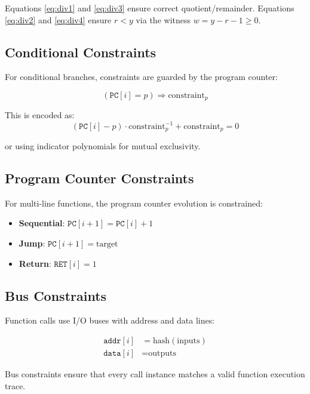 \documentclass[11pt,a4paper]{article}
\begin{document}
Equations \eqref{eq:div1} and \eqref{eq:div3} ensure correct quotient/remainder.
Equations \eqref{eq:div2} and \eqref{eq:div4} ensure $r < y$ via the witness $w = y - r - 1 \geq 0$.

\subsection{Conditional Constraints}

For conditional branches, constraints are guarded by the program counter:

\begin{equation}
(\texttt{PC}[i] = p) \Rightarrow \text{constraint}_p
\end{equation}

This is encoded as:
\begin{equation}
(\texttt{PC}[i] - p) \cdot \text{constraint}_p^{-1} + \text{constraint}_p = 0
\end{equation}

or using indicator polynomials for mutual exclusivity.

\subsection{Program Counter Constraints}

For multi-line functions, the program counter evolution is constrained:

\begin{itemize}
    \item \textbf{Sequential}: $\texttt{PC}[i+1] = \texttt{PC}[i] + 1$
    \item \textbf{Jump}: $\texttt{PC}[i+1] = \text{target}$
    \item \textbf{Return}: $\texttt{RET}[i] = 1$
\end{itemize}

\subsection{Bus Constraints}

Function calls use I/O buses with address and data lines:

\begin{align}
\texttt{addr}[i] &= \text{hash}(\text{inputs}) \\
\texttt{data}[i] &= \text{outputs}
\end{align}

Bus constraints ensure that every call instance matches a valid function execution trace.
\end{document}
